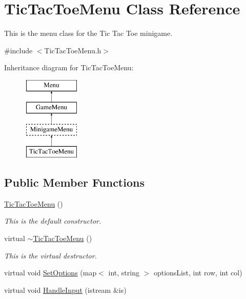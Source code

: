 \hypertarget{classTicTacToeMenu}{\section{Tic\-Tac\-Toe\-Menu Class Reference}
\label{classTicTacToeMenu}
}


This is the menu class for the Tic Tac Toe minigame.  




{\ttfamily \#include $<$Tic\-Tac\-Toe\-Menu.\-h$>$}

Inheritance diagram for Tic\-Tac\-Toe\-Menu\-:\begin{figure}[H]
\begin{center}
\leavevmode
\includegraphics[height=4.000000cm]{classTicTacToeMenu}
\end{center}
\end{figure}
\subsection*{Public Member Functions}
\begin{DoxyCompactItemize}
\item 
\hypertarget{classTicTacToeMenu_a15e92bc5e44266bbc23bbce421186dad}{\hyperlink{classTicTacToeMenu_a15e92bc5e44266bbc23bbce421186dad}{Tic\-Tac\-Toe\-Menu} ()}\label{classTicTacToeMenu_a15e92bc5e44266bbc23bbce421186dad}

\begin{DoxyCompactList}\small\item\em This is the default constructor. \end{DoxyCompactList}\item 
\hypertarget{classTicTacToeMenu_a429d4d036694b8d96b08896f50d5f19b}{virtual \hyperlink{classTicTacToeMenu_a429d4d036694b8d96b08896f50d5f19b}{$\sim$\-Tic\-Tac\-Toe\-Menu} ()}\label{classTicTacToeMenu_a429d4d036694b8d96b08896f50d5f19b}

\begin{DoxyCompactList}\small\item\em This is the virtual destructor. \end{DoxyCompactList}\item 
virtual void \hyperlink{classTicTacToeMenu_a15f91b593ac1b58fc8b1b5267c9141d3}{Set\-Options} (map$<$ int, string $>$ options\-List, int row, int col)
\item 
virtual void \hyperlink{classTicTacToeMenu_a11191814019309260bb4270c03891e5e}{Handle\-Input} (istream \&is)
\end{DoxyCompactItemize}

